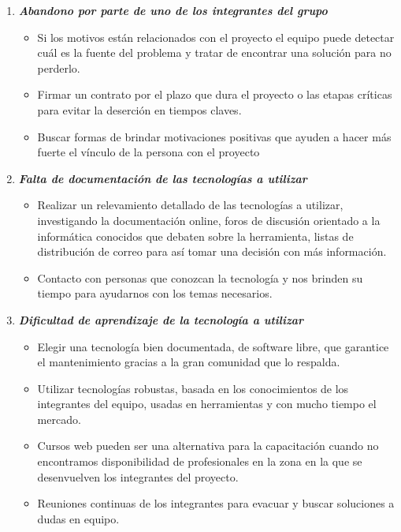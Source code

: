 	\begin{enumerate}
		\item \textbf{\textit{Abandono por parte de uno de los integrantes del grupo}}
        	\begin{itemize}
				\item Si los motivos están relacionados con el proyecto el equipo puede detectar cuál es la fuente del problema y tratar de encontrar una solución para no perderlo.
                \item Firmar un contrato por el plazo que dura el proyecto o las etapas críticas para evitar la deserción en tiempos claves.
                \item Buscar formas de brindar motivaciones positivas que ayuden a hacer más fuerte el vínculo de la persona con el proyecto
			\end{itemize}
        \item \textbf{\textit{Falta de documentación de las tecnologías a utilizar}}
        	\begin{itemize}
				\item Realizar un relevamiento detallado de las tecnologías a utilizar, investigando la documentación online, foros de discusión orientado a la informática conocidos que debaten sobre la herramienta, listas de distribución de correo para así tomar una decisión con más información.
                \item Contacto con personas que conozcan la tecnología y nos brinden su tiempo para ayudarnos con los temas necesarios.
			\end{itemize}
        \item \textbf{\textit{Dificultad de aprendizaje de la tecnología a utilizar}}
        	\begin{itemize}
				\item Elegir una tecnología bien documentada,  de software libre, que garantice el mantenimiento gracias a la gran comunidad que lo respalda.
                \item Utilizar tecnologías robustas, basada en los conocimientos de los integrantes del equipo, usadas en herramientas y con mucho tiempo el mercado.
                \item Cursos web pueden ser una alternativa para la capacitación cuando no encontramos disponibilidad de profesionales en la zona en la que se desenvuelven los integrantes del proyecto.
                \item Reuniones continuas de los integrantes para evacuar y buscar soluciones a dudas en equipo.

\end{itemize}
\end{enumerate}
